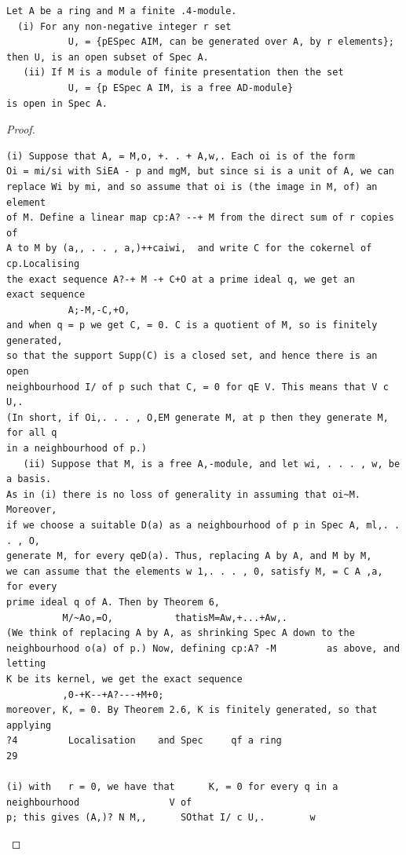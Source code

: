 \begin{theorem}\label{mcrt-auto-theorem-4-10}\uses{}
\begin{verbatim}
Let A be a ring and M a finite .4-module.
  (i) For any non-negative integer r set
           U, = {pESpec AIM, can be generated over A, by r elements};
then U, is an open subset of Spec A.
   (ii) If M is a module of finite presentation then the set
           U, = {p ESpec A IM, is a free AD-module}
is open in Spec A.
\end{verbatim}
\end{theorem}
\begin{proof}
\begin{verbatim}
(i) Suppose that A, = M,o, +. . + A,w,. Each oi is of the form
Oi = mi/si with SiEA - p and mgM, but since si is a unit of A, we can
replace Wi by mi, and so assume that oi is (the image in M, of) an element
of M. Define a linear map cp:A? --+ M from the direct sum of r copies of
A to M by (a,, . . , a,)++caiwi,  and write C for the cokernel of cp.Localising
the exact sequence A?-+ M -+ C+O at a prime ideal q, we get an
exact sequence
           A;-M,-C,+O,
and when q = p we get C, = 0. C is a quotient of M, so is finitely generated,
so that the support Supp(C) is a closed set, and hence there is an open
neighbourhood I/ of p such that C, = 0 for qE V. This means that V c U,.
(In short, if Oi,. . . , O,EM generate M, at p then they generate M, for all q
in a neighbourhood of p.)
   (ii) Suppose that M, is a free A,-module, and let wi, . . . , w, be a basis.
As in (i) there is no loss of generality in assuming that oi~M. Moreover,
if we choose a suitable D(a) as a neighbourhood of p in Spec A, ml,. . . , O,
generate M, for every qeD(a). Thus, replacing A by A, and M by M,
we can assume that the elements w 1,. . . , 0, satisfy M, = C A ,a, for every
prime ideal q of A. Then by Theorem 6,
          M/~Ao,=O,           thatisM=Aw,+...+Aw,.
(We think of replacing A by A, as shrinking Spec A down to the
neighbourhood o(a) of p.) Now, defining cp:A? -M         as above, and letting
K be its kernel, we get the exact sequence
          ,0-+K--+A?---+M+0;
moreover, K, = 0. By Theorem 2.6, K is finitely generated, so that applying
?4         Localisation    and Spec     qf a ring                                           29

(i) with   r = 0, we have that      K, = 0 for every q in a neighbourhood                V of
p; this gives (A,)? N M,,      SOthat I/ c U,.        w
\end{verbatim}
\end{proof}


